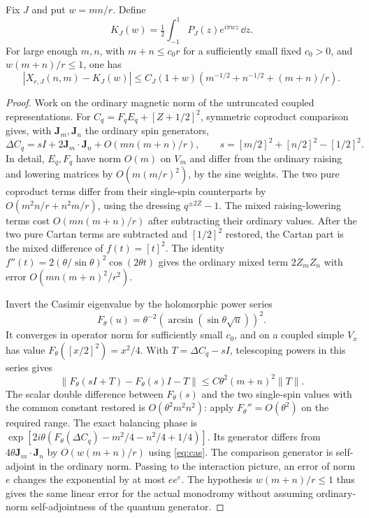 \begin{lemma}\label{lem:grow}
Fix \(J\) and put \(w=mn/r\). Define
\[K_J(w)=\tfrac12\int_{-1}^1 P_J(z)e^{i\pi wz}\,\dd z.\]
For large enough \(m,n\), with \(m+n\le c_0 r\) for a sufficiently small fixed \(c_0>0\), and \(w(m+n)/r\le1\), one has
\begin{equation}\label{eq:grow}
 |X_{r,J}(n,m)-K_J(w)|
 \le C_J(1+w)(m^{-1/2}+n^{-1/2}+(m+n)/r).
\end{equation}
\end{lemma}
\begin{proof}
Work on the ordinary magnetic norm of the untruncated coupled representations. For \(C_q=F_qE_q+[Z+1/2]^2\), symmetric coproduct comparison gives, with \(\mathbf J_m,\mathbf J_n\) the ordinary spin generators,
\begin{equation}\label{eq:cas}
 \Delta C_q=sI+2\mathbf J_m\cdot\mathbf J_n+
            O(mn(m+n)/r),\qquad
 s=[m/2]^2+[n/2]^2-[1/2]^2.
\end{equation}
In detail, \(E_q,F_q\) have norm \(O(m)\) on \(V_m\) and differ from the ordinary raising and lowering matrices by \(O(m(m/r)^2)\), by the sine weights. The two pure coproduct terms differ from their single-spin counterparts by \(O(m^2 n/r+n^2 m/r)\), using the dressing \(q^{\pm2Z}-1\). The mixed raising-lowering terms cost \(O(mn(m+n)/r)\) after subtracting their ordinary values. After the two pure Cartan terms are subtracted and \([1/2]^2\) restored, the Cartan part is the mixed difference of \(f(t)=[t]^2\). The identity
\(f''(t)=2(\theta/\sin\theta)^2\cos(2\theta t)\)
gives the ordinary mixed term \(2Z_m Z_n\) with error \(O(mn(m+n)^2/r^2)\).

Invert the Casimir eigenvalue by the holomorphic power series
\[
        F_\theta(u)=\theta^{-2}(\arcsin(\sin\theta\sqrt u))^2 .
\]
It converges in operator norm for sufficiently small \(c_0\), and on a coupled simple \(V_x\) has value \(F_\theta([x/2]^2)=x^2/4\). With \(T=\Delta C_q-sI\), telescoping powers in this series gives
\[
 \|F_\theta(sI+T)-F_\theta(s)I-T\|
       \le C\theta^2(m+n)^2\|T\|.
\]
The scalar double difference between \(F_\theta(s)\) and the two single-spin values with the common constant restored is \(O(\theta^2m^2n^2)\): apply \(F_\theta''=O(\theta^2)\) on the required range. The exact balancing phase is
\(\exp[2i\theta(F_\theta(\Delta C_q)-m^2/4-n^2/4+1/4)]\).
Its generator differs from \(4\theta\mathbf J_m\cdot\mathbf J_n\) by \(O(w(m+n)/r)\) using \eqref{eq:cas}. The comparison generator is self-adjoint in the ordinary norm. Passing to the interaction picture, an error of norm \(e\) changes the exponential by at most \(e e^e\). The hypothesis \(w(m+n)/r\le1\) thus gives the same linear error for the actual monodromy without assuming ordinary-norm self-adjointness of the quantum generator.


\end{proof}
